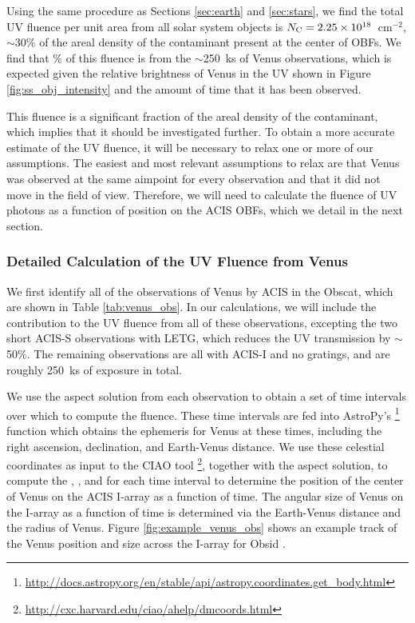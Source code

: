 \documentclass[11pt]{article}
\begin{document}
Using the same procedure as Sections \ref{sec:earth} and \ref{sec:stars}, we find the total UV fluence per unit area from all solar system objects is $N_{\rm C} = 2.25 \times 10^{18}$~cm$^{-2}$, $\sim$30\% of the areal density of the contaminant present at the center of OBFs. We find that \% of this fluence is from the $\sim$250~ks of Venus observations, which is expected given the relative brightness of Venus in the UV shown in Figure \ref{fig:ss_obj_intensity} and the amount of time that it has been observed.

This fluence is a significant fraction of the areal density of the contaminant, which implies that it should be investigated further. To obtain a more accurate estimate of the UV fluence, it will be necessary to relax one or more of our assumptions. The easiest and most relevant assumptions to relax are that Venus was observed at the same aimpoint for every observation and that it did not move in the field of view. Therefore, we will need to calculate the fluence of UV photons as a function of position on the ACIS OBFs, which we detail in the next section.

\subsubsection{Detailed Calculation of the UV Fluence from Venus}\label{sec:venus}

We first identify all of the observations of Venus by ACIS in the Obscat, which are shown in Table \ref{tab:venus_obs}. In our calculations, we will include the contribution to the UV fluence from all of these
observations, excepting the two short ACIS-S observations with LETG, which reduces the UV transmission by $\sim$50\%. The remaining observations are all with ACIS-I and no gratings, and are roughly 250~ks of exposure in total.

We use the aspect solution from each observation to obtain a set of time intervals over which to compute the fluence. These time intervals are fed into AstroPy's \footnote{\url{http://docs.astropy.org/en/stable/api/astropy.coordinates.get_body.html}} function which obtains the ephemeris for Venus at these times, including the right ascension, declination, and Earth-Venus distance. We use these celestial coordinates as input to the CIAO tool \footnote{\url{http://cxc.harvard.edu/ciao/ahelp/dmcoords.html}}, together with the aspect solution, to compute the , , and  for each time interval to determine the position of the center of Venus on the ACIS I-array as a function of time. The angular size of Venus on the I-array as a function of time is determined via the Earth-Venus distance and the radius of Venus. Figure \ref{fig:example_venus_obs} shows an example track of the Venus position and size across the I-array for Obsid .
\end{document}
